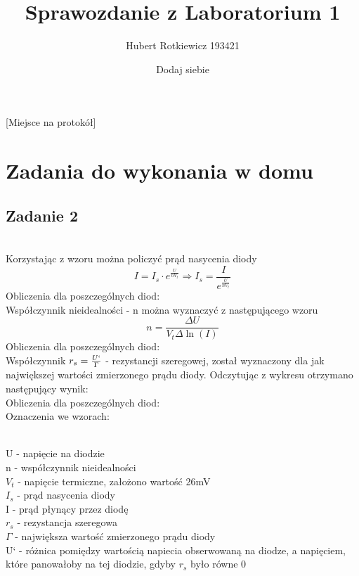 \documentclass{article}
\title{Sprawozdanie z Laboratorium 1}
\author{
  Hubert Rotkiewicz 193421 \and 
Dodaj siebie
}
\begin{document}
[Miejsce na protokół]
\maketitle
\section{Zadania do wykonania w domu}
\subsection{Zadanie 2}
 \\
Korzystając z wzoru można policzyć prąd nasycenia diody\[
  I = I_s \cdot e^{\frac{U}{nV_t}} \Rightarrow
  I_s = \frac{I}{e^{\frac{U}{nV_t}}} 
\]
Obliczenia dla poszczególnych diod: \\
Współczynnik nieidealności - n można wyznaczyć z następującego wzoru \[
  n = \frac{\Delta{U}}{V_t \Delta{\ln(I)}}
\]
Obliczenia dla poszczególnych diod: \\
Współczynnik $r_s=\frac{U`}{\Gamma}$ - rezystancji szeregowej, został wyznaczony dla jak największej wartości zmierzonego prądu diody. Odczytując z wykresu otrzymano następujący wynik:\\
Obliczenia dla poszczególnych diod: \\
Oznaczenia we wzorach:
\raggedright
\\ U - napięcie na diodzie\\ n - współczynnik nieidealności\\ $V_t$ - napięcie termiczne, założono wartość 26mV\\ 
$I_s$ - prąd nasycenia diody\\ I - prąd płynący przez diodę\\ $r_s$ - rezystancja szeregowa\\ $\Gamma$ - największa wartość zmierzonego prądu diody \\
U` - różnica pomiędzy wartością napiecia obserwowaną na diodze, a napięciem, które panowałoby na tej diodzie, gdyby $r_s$ było równe 0\\
\break
\raggedright
\end{document}
